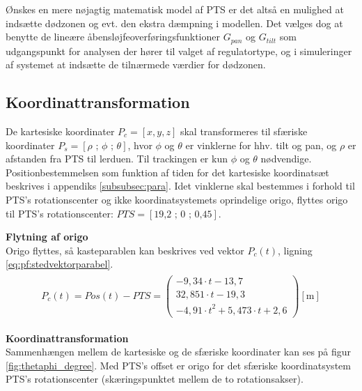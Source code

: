 Ønskes en mere nøjagtig matematisk model af PTS
er det altså en mulighed at indsætte dødzonen og evt. den ekstra dæmpning i modellen.
Det vælges dog at benytte de lineære åbensløjfeoverføringsfunktioner \(G_{pan}\) og \(G_{tilt}\)
som udgangspunkt for analysen der hører til valget af regulatortype,
og i simuleringer af systemet at indsætte de tilnærmede værdier for dødzonen.

\subsection{Koordinattransformation}
\label{sec:koordinattransformation}
De kartesiske koordinater \(P_c=\left[x, y, z\right]\) skal transformeres til sfæriske koordinater
\(P_s=\left[\rho \text{ ; } \phi \text{ ; } \theta\right]\), hvor \(\phi\) og \(\theta\) er vinklerne for hhv. tilt og pan, og \(\rho\) er afstanden fra PTS til lerduen.
Til trackingen er kun \(\phi\) og \(\theta\) nødvendige.
Positionbestemmelsen som funktion af tiden for det kartesiske koordinatsæt beskrives i appendiks \ref{subsubsec:para}.
Idet vinklerne skal bestemmes i forhold til PTS's rotationscenter og ikke koordinatsystemets oprindelige origo,
flyttes origo til PTS's rotationscenter:
\(PTS=[\text{19,2 ; 0 ; 0,45}]\). 

\textbf{Flytning af origo}\\
Origo flyttes, så kasteparablen kan beskrives ved vektor \(P_c\left(t\right)\), ligning \ref{eq:pf:stedvektorparabel}.
\begin{align}
\begin{split}
{ P }_{ c }\left(t\right)=Pos\left( t \right) -PTS = \left( \begin{matrix} - 9,34\cdot t-13,7 \\32,851\cdot t-19,3
\\-{ 4,91\cdot t }^{ 2 }+5,473\cdot t+2,6\end{matrix} \right) [\text{m}]
\label{eq:pf:stedvektorparabel}
\end{split}
\end{align}

\textbf{Koordinattransformation}\\
Sammenhængen mellem de kartesiske og de sfæriske koordinater kan ses på figur \ref{fig:thetaphi_degree}. 
Med PTS's offset er origo for det sfæriske koordinatsystem PTS's rotationscenter (skæringspunktet mellem de to rotationsakser).

